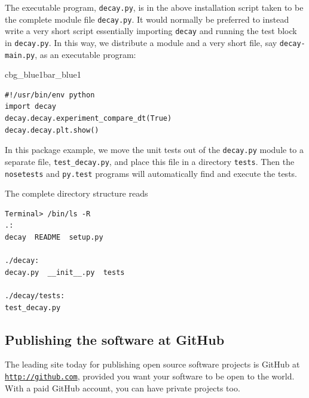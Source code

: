 \documentclass[%
oneside,                 %
final,                   %
10pt]{article}
\newenvironment{_pro_tight}[2]{
   \def\FrameCommand{\color{#2}\vrule width 1mm\normalcolor\colorbox{#1}}
   \FrameRule0.6pt\MakeFramed {\advance\hsize-2mm\FrameRestore}\vskip3mm}
   {\vskip0mm\endMakeFramed}
\newenvironment{pro}[2]{
\bgroup\rmfamily
\fboxsep=0mm\relax
\begin{_pro_tight}{#1}{#2}
\list{}{\parsep=-2mm\parskip=0mm\topsep=0pt\leftmargin=2mm
\rightmargin=2\leftmargin\leftmargin=4pt\relax}
\item\relax}
{\endlist\end{_pro_tight}\egroup}
\newenvironment{notice_mdfboxadmon}[1][]{
\begin{notice_mdfboxmdframed}[frametitle=#1]
}
{
\end{notice_mdfboxmdframed}
}
\begin{document}


\begin{notice_mdfboxadmon}
The executable program, \texttt{decay.py}, is in the above installation
script taken to be the complete
module file \texttt{decay.py}. It would normally be preferred to instead
write a very short script essentially importing \texttt{decay} and running
the test block in \texttt{decay.py}.  In this way, we distribute a module and
a very short file, say \texttt{decay-main.py}, as an executable program:

\begin{pro}{cbg_blue1}{bar_blue1}\begin{Verbatim}[numbers=none,fontsize=\fontsize{9pt}{9pt},baselinestretch=0.95,xleftmargin=2mm]
#!/usr/bin/env python
import decay
decay.decay.experiment_compare_dt(True)
decay.decay.plt.show()
\end{Verbatim}
\end{pro}
\noindent
\end{notice_mdfboxadmon}



In this package example, we move the unit tests out of the \texttt{decay.py}
module to a separate file, \Verb!test_decay.py!, and place this file in a
directory \texttt{tests}. Then the \texttt{nosetests} and \texttt{py.test} programs will
automatically find and execute the tests.

The complete directory structure reads

\begin{Verbatim}[frame=lines,label=\fbox{{\tiny Terminal}},framesep=2.5mm,framerule=0.7pt,fontsize=\fontsize{9pt}{9pt}]
Terminal> /bin/ls -R
.:
decay  README  setup.py

./decay:
decay.py  __init__.py  tests

./decay/tests:
test_decay.py
\end{Verbatim}

\subsection{Publishing the software at GitHub}


The leading site today for publishing open source software projects is
GitHub at \href{{http://github.com}}{\nolinkurl{http://github.com}}, provided you want your software to
be open to the world. With a paid GitHub account, you can have private
projects too.
\end{document}
